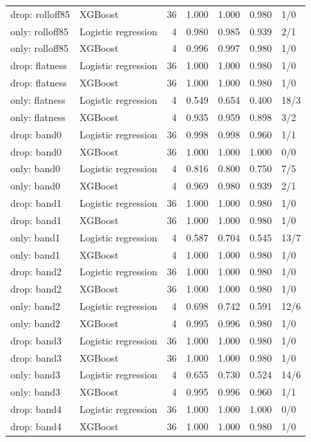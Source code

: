 \documentclass[10pt,a4paper]{article}
\begin{document}
\begin{center}
\begin{longtable}{llrrrrl}
drop: rolloff85 & XGBoost & 36 & 1.000 & 1.000 & 0.980 & 1/0\\
only: rolloff85 & Logistic regression & 4 & 0.980 & 0.985 & 0.939 & 2/1\\
only: rolloff85 & XGBoost & 4 & 0.996 & 0.997 & 0.980 & 1/0\\
drop: flatness & Logistic regression & 36 & 1.000 & 1.000 & 0.980 & 1/0\\
drop: flatness & XGBoost & 36 & 1.000 & 1.000 & 0.980 & 1/0\\
only: flatness & Logistic regression & 4 & 0.549 & 0.654 & 0.400 & 18/3\\
only: flatness & XGBoost & 4 & 0.935 & 0.959 & 0.898 & 3/2\\
drop: band0 & Logistic regression & 36 & 0.998 & 0.998 & 0.960 & 1/1\\
drop: band0 & XGBoost & 36 & 1.000 & 1.000 & 1.000 & 0/0\\
only: band0 & Logistic regression & 4 & 0.816 & 0.800 & 0.750 & 7/5\\
only: band0 & XGBoost & 4 & 0.969 & 0.980 & 0.939 & 2/1\\
drop: band1 & Logistic regression & 36 & 1.000 & 1.000 & 0.980 & 1/0\\
drop: band1 & XGBoost & 36 & 1.000 & 1.000 & 0.980 & 1/0\\
only: band1 & Logistic regression & 4 & 0.587 & 0.704 & 0.545 & 13/7\\
only: band1 & XGBoost & 4 & 1.000 & 1.000 & 0.980 & 1/0\\
drop: band2 & Logistic regression & 36 & 1.000 & 1.000 & 0.980 & 1/0\\
drop: band2 & XGBoost & 36 & 1.000 & 1.000 & 0.980 & 1/0\\
only: band2 & Logistic regression & 4 & 0.698 & 0.742 & 0.591 & 12/6\\
only: band2 & XGBoost & 4 & 0.995 & 0.996 & 0.980 & 1/0\\
drop: band3 & Logistic regression & 36 & 1.000 & 1.000 & 0.980 & 1/0\\
drop: band3 & XGBoost & 36 & 1.000 & 1.000 & 0.980 & 1/0\\
only: band3 & Logistic regression & 4 & 0.655 & 0.730 & 0.524 & 14/6\\
only: band3 & XGBoost & 4 & 0.995 & 0.996 & 0.960 & 1/1\\
drop: band4 & Logistic regression & 36 & 1.000 & 1.000 & 1.000 & 0/0\\
drop: band4 & XGBoost & 36 & 1.000 & 1.000 & 0.980 & 1/0\\

\end{longtable}
\end{center}
\end{document}
